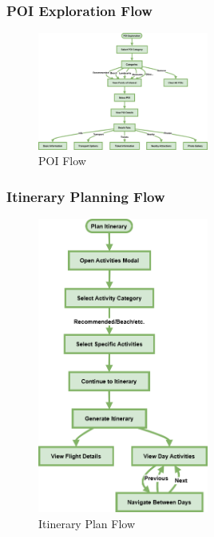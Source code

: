 \documentclass[]{project_final}
\begin{document}
\newpage
\subsubsection{POI Exploration Flow}

\begin{figure}[ht!]
    \centering
    \includegraphics[width=0.5\textwidth]{TPPOIFlow.png}
    \vspace*{0.0cm}
    \caption{POI Flow}
    \label{fig:1}
\end{figure}
\newpage
\subsubsection{Itinerary Planning Flow}

\begin{figure}[ht!]
    \centering
    \includegraphics[width=0.5\textwidth]{TPItineraryPlanFlow.png}
    \vspace*{0.0cm}
    \caption{Itinerary Plan Flow}
    \label{fig:1}
\end{figure}
\newpage
\end{document}
